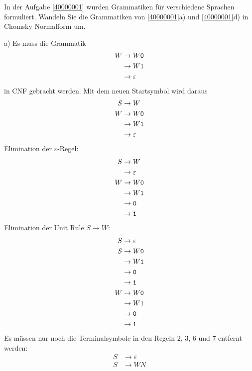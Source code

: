 In der Aufgabe \ref{40000001} wurden Grammatiken für verschiedene
Sprachen formuliert.
Wandeln Sie die Grammatiken von \ref{40000001}a) und \ref{40000001}d) in Chomsky Normalform um.


\begin{loesung}
\begin{teilaufgaben}
\item[a)] Es muss die Grammatik
\begin{align*}
W&\rightarrow W{\tt 0}\\
 &\rightarrow W{\tt 1}\\
 &\rightarrow\varepsilon
\end{align*}
in CNF gebracht werden. Mit dem neuen Startsymbol wird daraus
\begin{align*}
S&\rightarrow W\\
W&\rightarrow W{\tt 0}\\
 &\rightarrow W{\tt 1}\\
 &\rightarrow\varepsilon
\end{align*}
Elimination der $\varepsilon$-Regel:
\begin{align*}
S&\rightarrow W\\
 &\rightarrow \varepsilon\\
W&\rightarrow W{\tt 0}\\
 &\rightarrow W{\tt 1}\\
 &\rightarrow {\tt 0}\\
 &\rightarrow {\tt 1}\\
\end{align*}
Elimination der Unit Rule $S\to W$:
\begin{align*}
S&\rightarrow \varepsilon\\
S&\rightarrow W{\tt 0}\\
 &\rightarrow W{\tt 1}\\
 &\rightarrow {\tt 0}\\
 &\rightarrow {\tt 1}\\
W&\rightarrow W{\tt 0}\\
 &\rightarrow W{\tt 1}\\
 &\rightarrow {\tt 0}\\
 &\rightarrow {\tt 1}\\
\end{align*}
Es müssen nur noch die Terminalsymbole in den Regeln 2, 3, 6 und 7
entfernt werden:
\begin{align*}
S&\rightarrow \varepsilon\\
S&\rightarrow WN\\

\end{align*}
\end{teilaufgaben}
\end{loesung}
